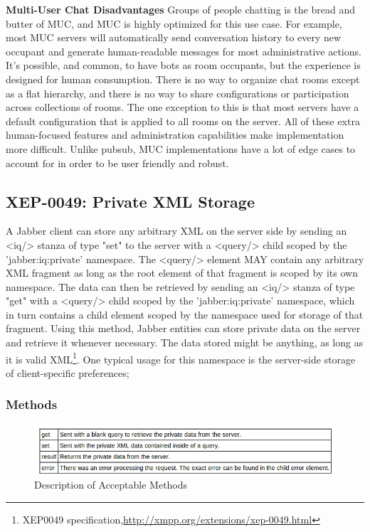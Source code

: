 	\textbf{Multi-User Chat Disadvantages}
	\newline
	Groups of people chatting is the bread and butter of MUC, and MUC is highly optimized for this use case. For example, most MUC servers will automatically send conversation history to every new occupant and generate human-readable messages for most administrative actions. It's possible, and common, to have bots as room occupants, but the experience is designed for human consumption. There is no way to organize chat rooms except as a flat hierarchy, and there is no way to share configurations or participation across collections of rooms. The one exception to this is that most servers have a default configuration that is applied to all rooms on the server. All of these extra human-focused features and administration capabilities make implementation more difficult. Unlike pubsub, MUC implementations have a lot of edge cases to account for in order to be user friendly and robust.


\subsection{XEP-0049: Private XML Storage}
	A Jabber client can store any arbitrary XML on the server side by sending an <iq/> stanza of type "set" to the server with a <query/> child scoped by the 'jabber:iq:private' namespace. The <query/> element MAY contain any arbitrary XML fragment as long as the root element of that fragment is scoped by its own namespace. The data can then be retrieved by sending an <iq/> stanza of type "get" with a <query/> child scoped by the 'jabber:iq:private' namespace, which in turn contains a child element scoped by the namespace used for storage of that fragment. Using this method, Jabber entities can store private data on the server and retrieve it whenever necessary. The data stored might be anything, as long as it is valid XML\footnote{XEP0049 specification,\url{http://xmpp.org/extensions/xep-0049.html}}. One typical usage for this namespace is the server-side storage of client-specific preferences; 
	
	\subsubsection{Methods}
	\begin{figure}[!ht]
		\centering
		\includegraphics[scale=0.9]{images/xep0049Queries.png}   
		\caption[ Description of Acceptable Methods]{ Description of Acceptable Methods}   
		\end{figure}

